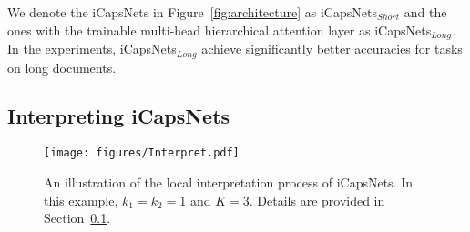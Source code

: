 \documentclass[10pt,journal,compsoc]{IEEEtran}
\begin{document}
We denote the iCapsNets in Figure~\ref{fig:architecture} as iCapsNets$_{Short}$ and the ones with the trainable multi-head hierarchical attention layer as iCapsNets$_{Long}$. In the experiments, iCapsNets$_{Long}$ achieve significantly better accuracies for tasks on long documents.

\subsection{Interpreting iCapsNets}\label{sec:interpreatation}

\begin{figure}[t]
	\centering
	\texttt{[image: figures/Interpret.pdf]}
	\caption{An illustration of the local interpretation process of iCapsNets. In this example, $k_1 = k_2 = 1$ and $K=3$. Details are provided in Section~\ref{sec:interpreatation}.}
	\label{fig:interpretation}
\end{figure}
\end{document}
